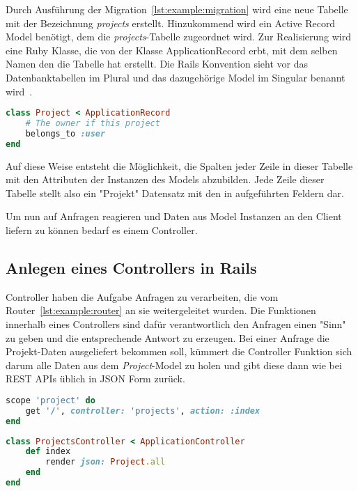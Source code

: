 Durch Ausführung der Migration~\ref{lst:example:migration} wird eine neue Tabelle mit der Bezeichnung \emph{projects} erstellt.
Hinzukommend wird ein Active Record Model benötigt, dem die \emph{projects}-Tabelle zugeordnet wird.
Zur Realisierung wird eine Ruby Klasse, die
von der Klasse ApplicationRecord erbt, mit dem selben Namen den die Tabelle hat erstellt.
Die Rails Konvention sieht vor das Datenbanktabellen im Plural und das dazugehörige Model im Singular benannt wird~\cite{rails-naming-convention}.

\begin{lstlisting}[language=Ruby,float=h!,caption={Model}, label={lst:example:model}]
class Project < ApplicationRecord
	# The owner if this project
	belongs_to :user
end
\end{lstlisting}

Auf diese Weise entsteht die Möglichkeit, die Spalten jeder Zeile in dieser Tabelle mit den Attributen der Instanzen des Models abzubilden.
Jede Zeile dieser Tabelle stellt also ein "Projekt" Datensatz mit den in  aufgeführten Feldern dar.

Um nun auf Anfragen reagieren und Daten aus Model Instanzen an den Client liefern zu können bedarf es einem Controller.

\subsection{Anlegen eines Controllers in Rails}
\label{sec:requirements:example:controller}
Controller haben die Aufgabe Anfragen zu verarbeiten, die vom Router~\ref{lst:example:router} an sie weitergeleitet wurden.
Die Funktionen innerhalb eines Controllers sind dafür verantwortlich den Anfragen einen "Sinn" zu geben und die entsprechende Antwort zu erzeugen.
Bei einer Anfrage die Projekt-Daten ausgeliefert bekommen soll, kümmert die Controller Funktion sich darum alle Daten aus dem \emph{Project}-Model
zu holen und gibt diese dann wie bei REST APIs üblich in JSON Form zurück.

\begin{lstlisting}[language=Ruby,float=h!,caption={Route entspricht URL '/project/' und leitet Anfrage an die ProjectsController Funktion \emph{index} weiter }, label={lst:example:router}]
scope 'project' do
	get '/', controller: 'projects', action: :index
end
\end{lstlisting}

\begin{lstlisting}[language=Ruby,float=h!,caption={Controller mit Funktion zum zurückgeben aller Project Instanzen}, label={lst:example:controller}]
class ProjectsController < ApplicationController
	def index
		render json: Project.all
	end
end
\end{lstlisting}


